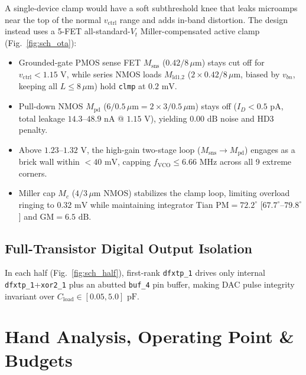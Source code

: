 \documentclass[10pt,twocolumn,letterpaper]{article}
\begin{document}
A single-device clamp would have a soft subthreshold knee that leaks microamps near the top of the normal $v_{\text{ctrl}}$ range and adds in-band distortion. The design instead uses a 5-FET all-standard-$V_t$ Miller-compensated active clamp (Fig.~\ref{fig:sch_ota}):
\begin{itemize}[leftmargin=1.1em,itemsep=0.5pt,topsep=1.5pt]
  \item Grounded-gate PMOS sense FET $M_{\text{sns}}$ ($0.42/8\,\mu\text{m}$) stays cut off for $v_{\text{ctrl}}<1.15\text{ V}$, while series NMOS loads $M_{\text{ld1,2}}$ ($2\times0.42/8\,\mu\text{m}$, biased by $v_{bn}$, keeping all $L\le8\,\mu\text{m}$) hold \texttt{clmp} at $0.2\text{ mV}$.
  \item Pull-down NMOS $M_{\text{pd}}$ ($6/0.5\,\mu\text{m}=2\times3/0.5\,\mu\text{m}$) stays off ($I_D<0.5\text{ pA}$, total leakage $14.3$--$48.9\text{ nA}$ @ $1.15\text{ V}$), yielding $0.00\text{ dB}$ noise and HD3 penalty.
  \item Above $1.23$--$1.32\text{ V}$, the high-gain two-stage loop ($M_{\text{sns}}\to M_{\text{pd}}$) engages as a brick wall within $<40\text{ mV}$, capping $f_{\text{VCO}}\le6.66\text{ MHz}$ across all 9 extreme corners.
  \item Miller cap $M_c$ ($4/3\,\mu\text{m}$ NMOS) stabilizes the clamp loop, limiting overload ringing to $0.32\text{ mV}$ while maintaining integrator Tian $\text{PM}=72.2^\circ$ [$67.7^\circ$--$79.8^\circ$] and $\text{GM}=6.5\text{ dB}$.
\end{itemize}

\subsection{Full-Transistor Digital Output Isolation}
In each half (Fig.~\ref{fig:sch_half}), first-rank \texttt{dfxtp\_1} drives only internal \texttt{dfxtp\_1}+\texttt{xor2\_1} plus an abutted \texttt{buf\_4} pin buffer, making DAC pulse integrity invariant over $C_{\text{load}}\in[0.05,5.0]\text{ pF}$.

\section{Hand Analysis, Operating Point \& Budgets}
\end{document}
